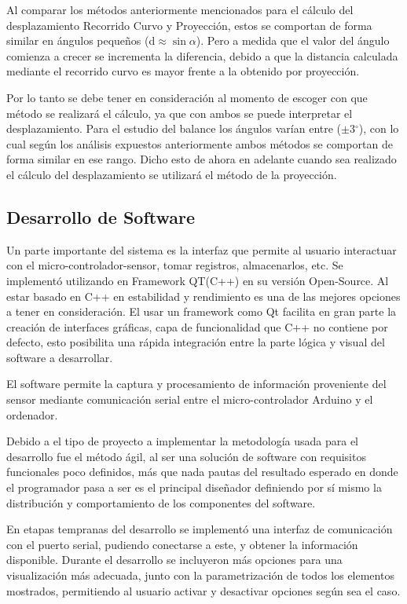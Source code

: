 \documentclass[12pt,a4paper]{article}
\newcommand{\grad}{$^{\circ}$}
\begin{document}
Al comparar los métodos anteriormente mencionados para el cálculo del desplazamiento Recorrido Curvo y Proyección, estos se comportan de forma similar en ángulos pequeños (d$\approx\sin\alpha$). Pero a medida que el valor del ángulo comienza a crecer se incrementa la diferencia, debido a que la distancia calculada mediante el recorrido curvo es mayor frente a la obtenido por proyección.

Por lo tanto se debe tener en consideración al momento de escoger con que método se realizará el cálculo, ya que con ambos se puede interpretar el desplazamiento. Para el estudio del balance los ángulos varían entre ($\pm 3$\grad), con lo cual según los análisis expuestos anteriormente ambos métodos se comportan de forma similar en ese rango.
Dicho esto de ahora en adelante cuando sea realizado el cálculo del desplazamiento se utilizará el método de la proyección.


\newpage
\subsection{Desarrollo de Software}
Un parte importante del sistema es la interfaz que permite al usuario interactuar con el micro-controlador-sensor, tomar registros, almacenarlos, etc.
Se implementó utilizando en Framework QT(C++)\cite{QT} en su versión Open-Source.
Al estar basado en C++ en estabilidad y rendimiento es una de las mejores opciones a tener en consideración.
El usar un framework como Qt facilita en gran parte la creación de interfaces gráficas, capa de funcionalidad que C++ no contiene por defecto, esto posibilita una rápida integración entre la parte lógica y visual del software a desarrollar.

El software permite la captura y procesamiento de información proveniente del sensor mediante comunicación serial entre el micro-controlador Arduino y el ordenador.

Debido a el tipo de proyecto a implementar la metodología usada para el desarrollo fue el método ágil, al ser una solución de software con requisitos funcionales poco definidos, más que nada pautas del resultado esperado en donde el programador pasa a ser es el principal diseñador definiendo por sí mismo la distribución y comportamiento de los componentes del software.

En etapas tempranas del desarrollo se implementó una interfaz de comunicación con el puerto serial, pudiendo conectarse a este, y obtener la información disponible.
Durante el desarrollo se incluyeron más opciones para una visualización más adecuada, junto con la parametrización de todos los elementos mostrados, permitiendo al usuario activar y desactivar opciones según sea el caso.
\end{document}
